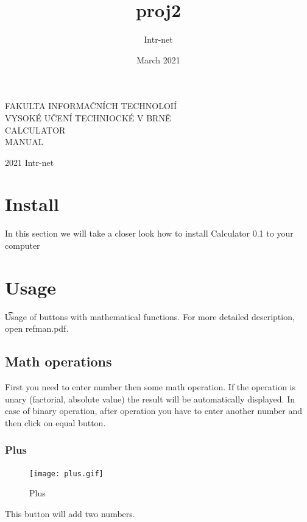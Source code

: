 \documentclass[11pt, a4paper]{article}
\title{proj2}
\author{Intr-net}
\date{March 2021}
\begin{document}
    \begin{titlepage}
        \begin{center}
            \vspace*{1cm}

            \huge
            \Huge F\huge AKULTA INFORMAČNÍCH TECHNOLOIÍ\\
            \hspace{0.2cm}
            \Huge V\huge YSOKÉ UČENÍ TECHNIOCKÉ V \Huge B\huge RNĚ\\
            CALCULATOR \\
            MANUAL


        \end{center}
        {\LARGE 2021 \hfill
        Intr-net}
    \end{titlepage}

    \newpage

    \tableofcontents


    \section{Install}
    \label{sec:install}
    In this section we will take a closer look how to install Calculator 0.1 to your computer


    \section{Usage}
    \t Usage of buttons with mathematical functions.
    For more detailed description, open refman.pdf.
    \label{sec:usage}

    \subsection{Math operations}
    \label{subsec:mathOperations}
        First you need to enter number then some math operation. If the operation is unary (factorial, absolute value) the result will be automatically displayed. In case of binary operation, after operation you have to enter another number and then click on equal button.
    \subsubsection{Plus}
    \label{subsubsec:plus}
        \begin{figure}[h]
        \caption{Plus}
        \texttt{[image: plus.gif]}
        \centering
        \label{fig:plus}
    \end{figure}
        This button will add two numbers.
\end{document}
